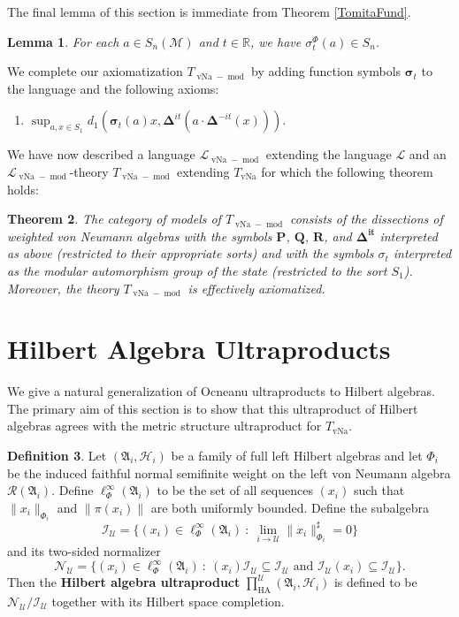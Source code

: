 \documentclass[12pt]{amsart}
\newtheorem{thm}{Theorem}[section]
\newtheorem{lem}[thm]{Lemma}
\theoremstyle{definition}
\newtheorem{defn}[thm]{Definition}
\def\cal{\mathcal}
\def \md{\operatorname{mod}}
\DeclareMathOperator{\vNa}{vNa}
\newcommand\cU{{\cal U}}
\def \HA{\operatorname{HA}}
\def \vP{\mathbf{P}}
\def \vQ{\mathbf{Q}}
\def \vR{\mathbf{R}}
\def \bbR{\mathbb{R}}
\begin{document}
The final lemma of this section is immediate from Theorem \ref{TomitaFund}.

\begin{lem}
    For each $a \in S_n(\cal M)$ and $t \in \bbR$, we have $\sigma^{\Phi}_t(a)\in S_n$.
\end{lem}

We complete our axiomatization $T_{\vNa-\md}$ by adding function symbols $\mathbf{\sigma}_{t}$ to the language and the following axioms:
\begin{enumerate}
    \item[(16)] $\sup_{a,x\in S_1} d_1(\mathbf{\sigma}_{t}(a)x,\mathbf{\mathbf{\Delta}}^{it}(a\cdot \mathbf{\Delta}^{-it}(x)))$.
\end{enumerate}

We have now described a language $\cal L_{\vNa-\md}$ extending the language $\cal L$ and an $\cal L_{\vNa-\md}$-theory $T_{\vNa-\md}$ extending $T_{\vNa}$ for which the following theorem holds:

\begin{thm}\label{moddefinable}
    The category of models of $T_{\vNa-\md}$ consists of the dissections of weighted von Neumann algebras with the symbols $\vP$, $\vQ$, $\vR$, and $\mathbf{\Delta^{it}}$ interpreted as above (restricted to their appropriate sorts) and with the symbols $\sigma_t$ interpreted as the modular automorphism group of the state (restricted to the sort $S_1$).  Moreover, the theory $T_{\vNa-\md}$ is effectively axiomatized.
\end{thm}

\section{Hilbert Algebra Ultraproducts}\label{SectionHAUltraproduct}

We give a natural generalization of Ocneanu ultraproducts to Hilbert algebras.  The primary aim of this section is to show that this ultraproduct of Hilbert algebras agrees with the metric structure ultraproduct for $T_{\vNa}$.

\begin{defn}
    Let $(\mathfrak{A}_i, \cal H_i)$ be a family of full left Hilbert algebras and let $\Phi_i$ be the induced faithful normal semifinite weight on the left von Neumann algebra $\cal R(\mathfrak{A}_i)$.  Define $\ell_{\Phi}^\infty(\mathfrak{A}_i)$ to be the set of all sequences $(x_i)$ such that $\|x_i\|_{\Phi_i}$ and $\|\pi(x_i)\|$ are both uniformly bounded.  Define the subalgebra
    \[
        \cal I_{\cU} = \bigl\{(x_i) \in \ell_{\Phi}^\infty(\mathfrak{A}_i) \ : \ \lim_{i \to \cU}\|x_i\|_{\Phi_i}^{\sharp} = 0\bigr\}
    \]
    and its two-sided normalizer
    \[
        \cal N_{\cU} = \{(x_i) \in \ell_{\Phi}^\infty(\mathfrak{A}_i) \ : \ (x_i) \cal I_{\cU} \subseteq \cal I_{\cU} \text{ and } \cal I_{\cU} (x_i)  \subseteq \cal I_{\cU}\}.
    \]
    Then the \textbf{Hilbert algebra ultraproduct} $\prod_{\HA}^{\cU} (\mathfrak{A}_i, \cal H_i)$ is defined to be $\cal N_{\cU}/\cal I_{\cU}$ together with its Hilbert space completion.
\end{defn}
\end{document}
